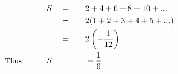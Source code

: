 \begin{alignat*}{5}
&\,&S\quad&=\quad&&2+4+6+8+10+...\\
&\,&\,&=&&2(1+2+3+4+5+...)\\
&\,&\,&=&&2\left(-\frac{1}{12}\right)\\
&\small\text{Thus}\normalsize\qquad&S\quad&=&&-\frac{1}{6}
\end{alignat*}
